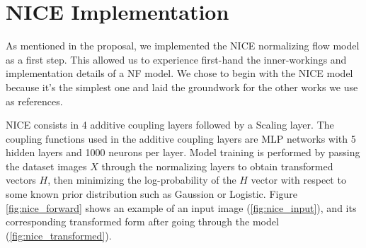 \section{NICE Implementation}

As mentioned in the proposal, we implemented the NICE\cite{nice} normalizing flow model as a first step. This allowed us to experience first-hand the inner-workings and implementation details of a NF model. We chose to begin with the NICE model because it's the simplest one and laid the groundwork for the other works we use as references. 

NICE consists in 4 additive coupling layers followed by a Scaling layer. The coupling functions used in the additive coupling layers are MLP networks with 5 hidden layers and 1000 neurons per layer. Model training is performed by passing the dataset images $X$ through the normalizing layers to obtain transformed vectors $H$, then minimizing the log-probability of the $H$ vector with respect to some known prior distribution such as Gaussion or Logistic. Figure \ref{fig:nice_forward} shows an example of an input image (\ref{fig:nice_input}), and its corresponding transformed form after going through the model (\ref{fig:nice_transformed}).

